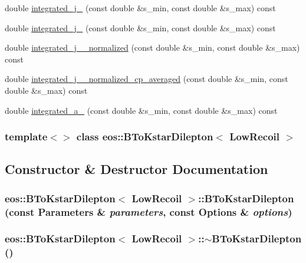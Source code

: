 \begin{DoxyCompactItemize}
double \hyperlink{classeos_1_1BToKstarDilepton_3_01LowRecoil_01_4_ae67222779f7f86cd7b7c6f68544dfb73}{integrated\_\-j\_} (const double \&s\_\-min, const double \&s\_\-max) const 
\item 
double \hyperlink{classeos_1_1BToKstarDilepton_3_01LowRecoil_01_4_a7f2ec4b984a86fe7debe06dcbda8dfc1}{integrated\_\-j\_} (const double \&s\_\-min, const double \&s\_\-max) const 
\item 
double \hyperlink{classeos_1_1BToKstarDilepton_3_01LowRecoil_01_4_a896472eb16708a931535978cdcbf2dbb}{integrated\_\-j\_\_\-normalized} (const double \&s\_\-min, const double \&s\_\-max) const 
\item 
double \hyperlink{classeos_1_1BToKstarDilepton_3_01LowRecoil_01_4_a9d70b5d31c39dec164f5ab1a8ab41e4f}{integrated\_\-j\_\_\-normalized\_\-cp\_\-averaged} (const double \&s\_\-min, const double \&s\_\-max) const 
\item 
double \hyperlink{classeos_1_1BToKstarDilepton_3_01LowRecoil_01_4_aa49cecdcb6cb3fe7a8bba8eff54910f6}{integrated\_\-a\_} (const double \&s\_\-min, const double \&s\_\-max) const 
\end{DoxyCompactItemize}
\subsubsection*{template$<$$>$ class eos::BToKstarDilepton$<$ LowRecoil $>$}



\subsection{Constructor \& Destructor Documentation}
\hypertarget{classeos_1_1BToKstarDilepton_3_01LowRecoil_01_4_aa4200bfda741e989e9fe17da1b066e95}{
\subsubsection[{BToKstarDilepton}]{\setlength{\rightskip}{0pt plus 5cm}eos::BToKstarDilepton$<$ {\bf LowRecoil} $>$::BToKstarDilepton (const {\bf Parameters} \& {\em parameters}, \/  const {\bf Options} \& {\em options})}}
\label{classeos_1_1BToKstarDilepton_3_01LowRecoil_01_4_aa4200bfda741e989e9fe17da1b066e95}
\hypertarget{classeos_1_1BToKstarDilepton_3_01LowRecoil_01_4_af83131c6414fa15740d0779b990457b6}{
\subsubsection[{$\sim$BToKstarDilepton}]{\setlength{\rightskip}{0pt plus 5cm}eos::BToKstarDilepton$<$ {\bf LowRecoil} $>$::$\sim$BToKstarDilepton ()}}
\label{classeos_1_1BToKstarDilepton_3_01LowRecoil_01_4_af83131c6414fa15740d0779b990457b6}


